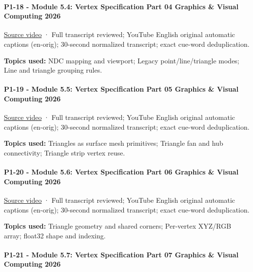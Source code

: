 \paragraph{P1-18 - Module 5.4: Vertex Specification Part 04 Graphics \& Visual Computing 2026}\label{p1-18---module-5.4-vertex-specification-part-04-graphics-visual-computing-2026}

\href{https://www.youtube.com/watch?v=yNa86goEb64}{Source video} · Full transcript reviewed; YouTube English original automatic captions (en-orig); 30-second normalized transcript; exact cue-word deduplication.

\textbf{Topics used:} NDC mapping and viewport; Legacy point/line/triangle modes; Line and triangle grouping rules.

\paragraph{P1-19 - Module 5.5: Vertex Specification Part 05 Graphics \& Visual Computing 2026}\label{p1-19---module-5.5-vertex-specification-part-05-graphics-visual-computing-2026}

\href{https://www.youtube.com/watch?v=IaV0iweZLxY}{Source video} · Full transcript reviewed; YouTube English original automatic captions (en-orig); 30-second normalized transcript; exact cue-word deduplication.

\textbf{Topics used:} Triangles as surface mesh primitives; Triangle fan and hub connectivity; Triangle strip vertex reuse.

\paragraph{P1-20 - Module 5.6: Vertex Specification Part 06 Graphics \& Visual Computing 2026}\label{p1-20---module-5.6-vertex-specification-part-06-graphics-visual-computing-2026}

\href{https://www.youtube.com/watch?v=S8gMtV0Zsa4}{Source video} · Full transcript reviewed; YouTube English original automatic captions (en-orig); 30-second normalized transcript; exact cue-word deduplication.

\textbf{Topics used:} Triangle geometry and shared corners; Per-vertex XYZ/RGB array; float32 shape and indexing.

\paragraph{P1-21 - Module 5.7: Vertex Specification Part 07 Graphics \& Visual Computing 2026}\label{p1-21---module-5.7-vertex-specification-part-07-graphics-visual-computing-2026}

